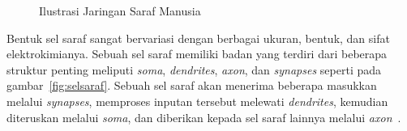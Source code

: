 \begin{figure}[htbp]
    \begin{center}
    \end{center}
    \vspace{-20pt}
    \captionsetup{labelfont=bf, textfont=bf}
    \caption{Ilustrasi Jaringan Saraf Manusia}
    \vspace{-10pt}
    \captionsetup{labelfont=md, textfont=md}
    \label{fig:jaringansaraf}
\end{figure}

Bentuk sel saraf sangat bervariasi dengan berbagai ukuran, bentuk, dan sifat elektrokimianya. Sebuah
sel saraf memiliki badan yang terdiri dari beberapa struktur penting meliputi \textit{soma},
\textit{dendrites}, \textit{axon}, dan \textit{synapses} seperti pada gambar~\ref{fig:selsaraf}.
Sebuah sel saraf akan menerima beberapa masukkan melalui \textit{synapses}, memproses inputan
tersebut melewati \textit{dendrites}, kemudian diteruskan melalui \textit{soma}, dan diberikan
kepada sel saraf lainnya melalui \textit{axon}~\cite{2019arXiv190601703Z}.

